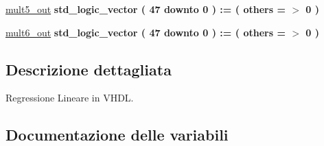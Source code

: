 \begin{DoxyCompactItemize}
\item 
\hyperlink{group___linear_regression_ga308e89f3c1df2b63a7dad6d0efa94e66}{mult5\+\_\+out} {\bfseries \textcolor{vhdlchar}{std\+\_\+logic\+\_\+vector}\textcolor{vhdlchar}{ }\textcolor{vhdlchar}{(}\textcolor{vhdlchar}{ }\textcolor{vhdlchar}{ } \textcolor{vhdldigit}{47} \textcolor{vhdlchar}{ }\textcolor{vhdlchar}{downto}\textcolor{vhdlchar}{ }\textcolor{vhdlchar}{ } \textcolor{vhdldigit}{0} \textcolor{vhdlchar}{ }\textcolor{vhdlchar}{)}\textcolor{vhdlchar}{ }\textcolor{vhdlchar}{ }\textcolor{vhdlchar}{ }\textcolor{vhdlchar}{\+:}\textcolor{vhdlchar}{=}\textcolor{vhdlchar}{ }\textcolor{vhdlchar}{(}\textcolor{vhdlchar}{ }\textcolor{vhdlchar}{ }\textcolor{vhdlchar}{others}\textcolor{vhdlchar}{ }\textcolor{vhdlchar}{ }\textcolor{vhdlchar}{=}\textcolor{vhdlchar}{ }\textcolor{vhdlchar}{$>$}\textcolor{vhdlchar}{ }\textcolor{vhdlchar}{\textquotesingle{}}\textcolor{vhdlchar}{ } \textcolor{vhdldigit}{0} \textcolor{vhdlchar}{ }\textcolor{vhdlchar}{\textquotesingle{}}\textcolor{vhdlchar}{ }\textcolor{vhdlchar}{)}\textcolor{vhdlchar}{ }} 
\item 
\hyperlink{group___linear_regression_ga207c875b3cd576e5064d6fd3b2a36759}{mult6\+\_\+out} {\bfseries \textcolor{vhdlchar}{std\+\_\+logic\+\_\+vector}\textcolor{vhdlchar}{ }\textcolor{vhdlchar}{(}\textcolor{vhdlchar}{ }\textcolor{vhdlchar}{ } \textcolor{vhdldigit}{47} \textcolor{vhdlchar}{ }\textcolor{vhdlchar}{downto}\textcolor{vhdlchar}{ }\textcolor{vhdlchar}{ } \textcolor{vhdldigit}{0} \textcolor{vhdlchar}{ }\textcolor{vhdlchar}{)}\textcolor{vhdlchar}{ }\textcolor{vhdlchar}{ }\textcolor{vhdlchar}{ }\textcolor{vhdlchar}{\+:}\textcolor{vhdlchar}{=}\textcolor{vhdlchar}{ }\textcolor{vhdlchar}{(}\textcolor{vhdlchar}{ }\textcolor{vhdlchar}{ }\textcolor{vhdlchar}{others}\textcolor{vhdlchar}{ }\textcolor{vhdlchar}{ }\textcolor{vhdlchar}{=}\textcolor{vhdlchar}{ }\textcolor{vhdlchar}{$>$}\textcolor{vhdlchar}{ }\textcolor{vhdlchar}{\textquotesingle{}}\textcolor{vhdlchar}{ } \textcolor{vhdldigit}{0} \textcolor{vhdlchar}{ }\textcolor{vhdlchar}{\textquotesingle{}}\textcolor{vhdlchar}{ }\textcolor{vhdlchar}{)}\textcolor{vhdlchar}{ }} 
\end{DoxyCompactItemize}


\subsection{Descrizione dettagliata}
Regressione Lineare in V\+H\+DL. 



\subsection{Documentazione delle variabili}
